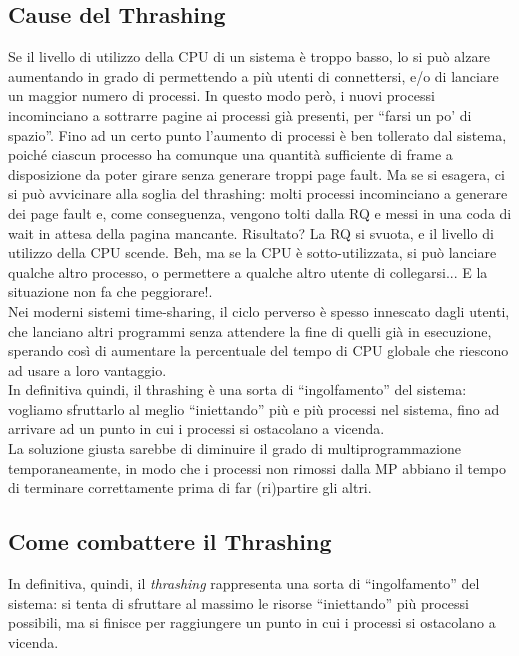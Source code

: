 \subsection{Cause del Thrashing}
Se il livello di utilizzo della CPU di un sistema è troppo basso, lo si può alzare aumentando in grado di permettendo a più utenti di connettersi, e/o di lanciare un maggior numero di processi. In questo modo però, i nuovi processi incominciano a sottrarre pagine ai processi già presenti, per “farsi un po' di spazio”. Fino ad un certo punto l’aumento di processi è ben tollerato dal sistema, poiché ciascun processo ha comunque una quantità sufficiente di frame a disposizione da poter girare senza generare troppi page fault. Ma se si esagera, ci si può avvicinare alla soglia del thrashing: molti processi incominciano a generare dei page fault e, come conseguenza, vengono tolti dalla RQ e messi in una coda di wait in attesa della pagina mancante. Risultato? La RQ si svuota, e il livello di utilizzo della CPU scende. Beh, ma se la CPU è sotto-utilizzata, si può lanciare qualche altro processo, o permettere a qualche altro utente di collegarsi... E la situazione non fa che peggiorare!.\\
Nei moderni sistemi time-sharing, il ciclo perverso è spesso innescato dagli utenti, che lanciano altri programmi senza attendere la fine di quelli già in esecuzione, sperando così di aumentare la percentuale del tempo di CPU globale che riescono ad usare a loro vantaggio.\\
In definitiva quindi, il thrashing è una sorta di “ingolfamento” del sistema: vogliamo sfruttarlo al meglio “iniettando” più e più processi nel sistema, fino ad arrivare ad un punto in cui i processi si ostacolano a vicenda.\\
La soluzione giusta sarebbe di diminuire il grado di multiprogrammazione temporaneamente, in modo che i processi non rimossi dalla MP abbiano il tempo di terminare correttamente prima di far (ri)partire gli altri.\\


\subsection{Come combattere il Thrashing}
In definitiva, quindi, il \textit{thrashing} rappresenta una sorta di “ingolfamento” del sistema: si tenta di sfruttare al massimo le risorse “iniettando” più processi possibili, ma si finisce per raggiungere un punto in cui i processi si ostacolano a vicenda.

